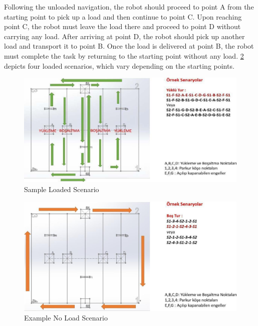 \documentclass[../../main]{subfiles}
\begin{document}
Following the unloaded navigation, the robot should proceed to point A from the starting point to pick up a load and then continue to point C. Upon reaching point C, the robot must leave the load there and proceed to point D without carrying any load. After arriving at point D, the robot should pick up another load and transport it to point B. Once the load is delivered at point B, the robot must complete the task by returning to the starting point without any load. \cref{Example No Load Scenario} depicts four loaded scenarios, which vary depending on the starting points.
\begin{figure}
    \centering
    \includegraphics[width=\textwidth]{img/samplTK.jpg}
    \caption{Sample Loaded Scenario}
    \label{sample loaded scenario}
\end{figure}
\begin{figure}[h!]
    \centering
    \includegraphics[width=1\textwidth]{img/mmapingTk.jpg}
    \caption{Example No Load Scenario}
    \label{Example No Load Scenario}
\end{figure}
\end{document}
